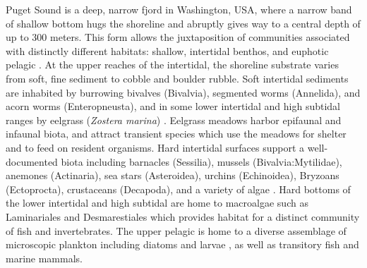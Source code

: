 \documentclass[11pt,letterpaper]{article} %
\begin{document}
Puget Sound is a deep, narrow fjord in Washington, USA, where a narrow band of shallow bottom hugs the shoreline and abruptly gives way to a central depth of up to 300 meters. This form allows the juxtaposition of communities associated with distinctly different habitats: shallow, intertidal benthos, and euphotic pelagic \citep{Burns1985}. At the upper reaches of the intertidal, the shoreline substrate varies from soft, fine sediment to cobble and boulder rubble. Soft intertidal sediments are inhabited by burrowing bivalves (Bivalvia), segmented worms (Annelida), and acorn worms (Enteropneusta), and in some lower intertidal and high subtidal ranges by eelgrass (\textit{Zostera marina}) \citep{Kozloff1973, Dethier2010} . Eelgrass meadows harbor epifaunal and infaunal biota, and attract transient species which use the meadows for shelter and to feed on resident organisms. Hard intertidal surfaces support a well-documented biota including barnacles (Sessilia), mussels (Bivalvia:Mytilidae), anemones (Actinaria), sea stars (Asteroidea), urchins (Echinoidea), Bryzoans (Ectoprocta), crustaceans (Decapoda), and a variety of algae \citep{Dethier2010}. Hard bottoms of the lower intertidal and high subtidal are home to macroalgae such as Laminariales and Desmarestiales which provides habitat for a distinct community of fish and invertebrates. The upper pelagic is home to a diverse assemblage of microscopic plankton including diatoms and larvae \citep{Strickland1983}, as well as transitory fish and marine mammals.
\end{document}
